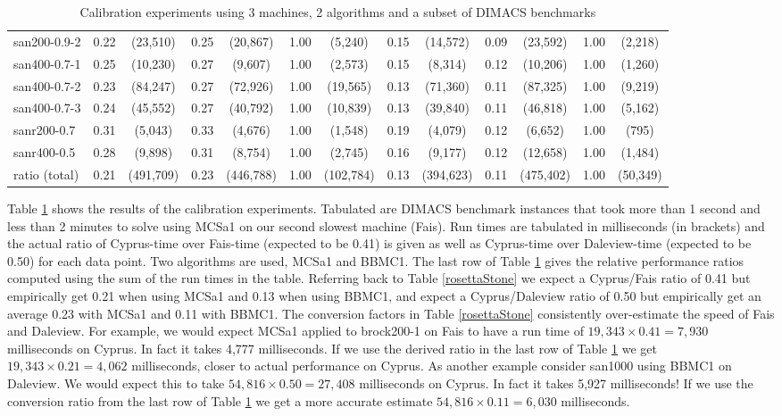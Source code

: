 \documentclass{l4proj}
\begin{document}
\begin{table}
\begin{center}
\begin{scriptsize}
\begin{tabular}{|l|c c|c c|c c|c c|c c|c c|}
san200-0.9-2 & 0.22 & (23,510) & 0.25 & (20,867) & 1.00 & (5,240) & 0.15 & (14,572) & 0.09 & (23,592) & 1.00 & (2,218) \\ 
san400-0.7-1 & 0.25 & (10,230) & 0.27 & (9,607) & 1.00 & (2,573) & 0.15 & (8,314) & 0.12 & (10,206) & 1.00 & (1,260) \\ 
san400-0.7-2 & 0.23 & (84,247) & 0.27 & (72,926) & 1.00 & (19,565) & 0.13 & (71,360) & 0.11 & (87,325) & 1.00 & (9,219) \\ 
san400-0.7-3 & 0.24 & (45,552) & 0.27 & (40,792) & 1.00 & (10,839) & 0.13 & (39,840) & 0.11 & (46,818) & 1.00 & (5,162) \\ 
sanr200-0.7 & 0.31 & (5,043) & 0.33 & (4,676) & 1.00 & (1,548) & 0.19 & (4,079) & 0.12 & (6,652) & 1.00 & (795) \\ 
sanr400-0.5 & 0.28 & (9,898) & 0.31 & (8,754) & 1.00 & (2,745) & 0.16 & (9,177) & 0.12 & (12,658) & 1.00 & (1,484) \\ \hline
ratio (total)    & 0.21 & (491,709) & 0.23 & (446,788) & 1.00 & (102,784) & 0.13 & (394,623) & 0.11 & (475,402) & 1.00 & (50,349) \\ \hline
\end{tabular}
\end{scriptsize}
\end{center}
\caption{Calibration experiments using 3 machines, 2 algorithms and a subset of DIMACS benchmarks}
\label{calibration}
\end{table}

Table \ref{calibration} shows the results of the calibration experiments. Tabulated are DIMACS benchmark instances that
took more than 1 second and less than 2 minutes to solve using MCSa1 on our second slowest machine (Fais). Run times are tabulated in
milliseconds (in brackets) and the actual ratio of Cyprus-time over Fais-time (expected to be 0.41) is given as well as Cyprus-time over
Daleview-time (expected to be 0.50) for each data point. Two algorithms are used, MCSa1 and BBMC1. The last row of
Table \ref{calibration} gives the 
relative performance ratios computed using the sum of the run times in the table. Referring back to Table \ref{rosettaStone} we expect a 
Cyprus/Fais ratio of 0.41 but empirically get
0.21 when using MCSa1 and 0.13 when using BBMC1, and expect a Cyprus/Daleview ratio of 0.50 but empirically
get an average 0.23 with MCSa1 and 0.11 with BBMC1. The conversion factors in Table \ref{rosettaStone} consistently
over-estimate the speed of Fais and Daleview. For example, we would expect MCSa1 applied to brock200-1 on Fais to have a run time
of $19,343 \times 0.41 = 7,930$ milliseconds on Cyprus. In fact it takes 4,777 milliseconds. If we use the derived ratio
in the last row of Table \ref{calibration} we get $19,343 \times 0.21 = 4,062$ milliseconds, closer to actual performance on Cyprus. 
As another example consider san1000 using BBMC1 on Daleview. We would expect this to take $54,816 \times 0.50 = 27,408$
milliseconds on Cyprus. In fact it takes 5,927 milliseconds! If we use the conversion ratio from the last row of Table \ref{calibration}
we get a more accurate estimate $54,816 \times 0.11 = 6,030$ milliseconds.
\end{document}
